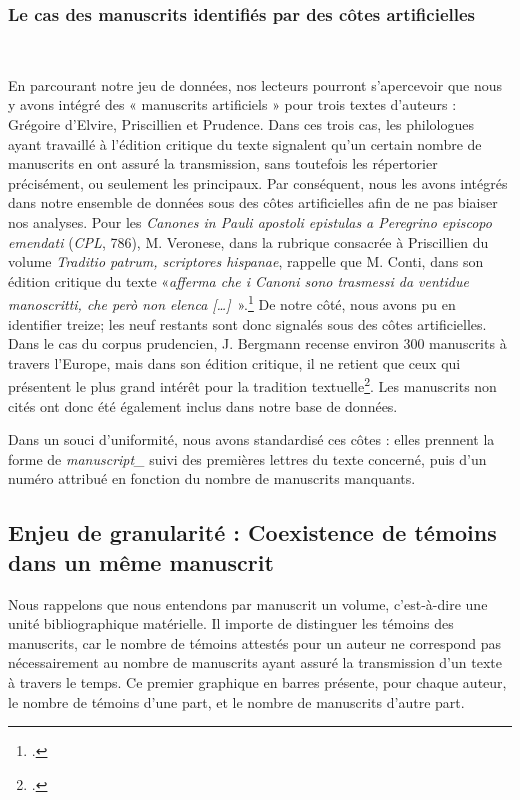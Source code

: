 \documentclass[a4paper,twoside,12pt]{book}
\begin{document}
\subsubsection{Le cas des manuscrits identifiés par des côtes artificielles}  

En parcourant notre jeu de données, nos lecteurs pourront s’apercevoir que nous y avons intégré des « manuscrits artificiels » pour trois textes d’auteurs : Grégoire d’Elvire, Priscillien et Prudence. Dans ces trois cas, les philologues ayant travaillé à l’édition critique du texte signalent qu’un certain nombre de manuscrits en ont assuré la transmission, sans toutefois les répertorier précisément, ou seulement les principaux. Par conséquent, nous les avons intégrés dans notre ensemble de données sous des côtes artificielles afin de ne pas biaiser nos analyses.
Pour les \textit{Canones in Pauli apostoli epistulas a Peregrino episcopo emendati} (\textit{CPL}, 786), M. Veronese, dans la rubrique consacrée à Priscillien du volume \textit{Traditio patrum, scriptores hispanae}, rappelle que M. Conti, dans son édition critique du texte «\textit{afferma che i Canoni sono trasmessi da ventidue manoscritti, che però non elenca […]} ».\footcite[p. 104]{TradPat}
De notre côté, nous avons pu en identifier treize; les neuf restants sont donc signalés sous des côtes artificielles.
Dans le cas du corpus prudencien, J. Bergmann recense environ 300 manuscrits à travers l'Europe, mais dans son édition critique, il ne retient que ceux qui présentent le plus grand intérêt pour la tradition textuelle\footcite[p. XIX–XLVIII]{Aureliiprudentii}. Les manuscrits non cités ont donc été également inclus dans notre base de données.

Dans un souci d’uniformité, nous avons standardisé ces côtes : elles prennent la forme de \textit{manuscript\_} suivi des premières lettres du texte concerné, puis d’un numéro attribué en fonction du nombre de manuscrits manquants.

\subsection{Enjeu de granularité : Coexistence de témoins dans un même manuscrit}
Nous rappelons que nous entendons par manuscrit un volume, c’est-à-dire une unité bibliographique matérielle. Il importe de distinguer les témoins des manuscrits, car le nombre de témoins attestés pour un auteur ne correspond pas nécessairement au nombre de manuscrits ayant assuré la transmission d'un texte à travers le temps. Ce premier graphique en barres présente, pour chaque auteur, le nombre de témoins d’une part, et le nombre de manuscrits d’autre part.
\end{document}
